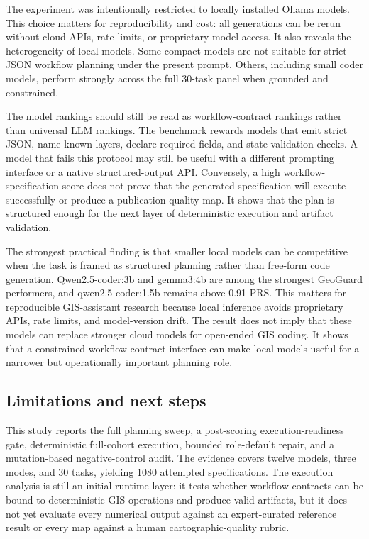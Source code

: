 \documentclass[12pt]{gsis}  %
\begin{document}
The experiment was intentionally restricted to locally installed Ollama models. This choice matters for reproducibility and cost: all generations can be rerun without cloud APIs, rate limits, or proprietary model access. It also reveals the heterogeneity of local models. Some compact models are not suitable for strict JSON workflow planning under the present prompt. Others, including small coder models, perform strongly across the full 30-task panel when grounded and constrained.

The model rankings should still be read as workflow-contract rankings rather than universal LLM rankings. The benchmark rewards models that emit strict JSON, name known layers, declare required fields, and state validation checks. A model that fails this protocol may still be useful with a different prompting interface or a native structured-output API. Conversely, a high workflow-specification score does not prove that the generated specification will execute successfully or produce a publication-quality map. It shows that the plan is structured enough for the next layer of deterministic execution and artifact validation.

The strongest practical finding is that smaller local models can be competitive when the task is framed as structured planning rather than free-form code generation. Qwen2.5-coder:3b and gemma3:4b are among the strongest GeoGuard performers, and qwen2.5-coder:1.5b remains above 0.91 PRS. This matters for reproducible GIS-assistant research because local inference avoids proprietary APIs, rate limits, and model-version drift. The result does not imply that these models can replace stronger cloud models for open-ended GIS coding. It shows that a constrained workflow-contract interface can make local models useful for a narrower but operationally important planning role.

\subsection{Limitations and next steps}

This study reports the full planning sweep, a post-scoring execution-readiness gate, deterministic full-cohort execution, bounded role-default repair, and a mutation-based negative-control audit. The evidence covers twelve models, three modes, and 30 tasks, yielding 1080 attempted specifications. The execution analysis is still an initial runtime layer: it tests whether workflow contracts can be bound to deterministic GIS operations and produce valid artifacts, but it does not yet evaluate every numerical output against an expert-curated reference result or every map against a human cartographic-quality rubric.
\end{document}
